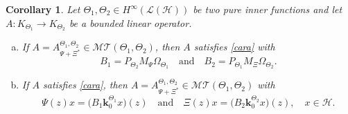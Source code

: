 \documentclass[11pt]{amsart}
\numberwithin{equation}{section}
\newcommand{\hsp}{\mathcal{H}}
\newcommand{\oL }{\mathcal{L}(\hsp) }
\newcommand{\dfc}[1]{D_{\Theta_#1}}
\newcommand{\ke}{{\mathbf{k}}}
\newtheorem{corollary}[theorem]{Corollary}
\theoremstyle{definition}
\numberwithin{equation}{section}
\begin{document}
%	


\begin{corollary}\label{cep}
	Let $ {\Theta_1},{\Theta_2} \in H^{\infty}(\oL)$ be two pure inner functions and let $A:K_{\Theta_{1}}\rightarrow  K_{\Theta_{2}}$ be a bounded linear operator.
	\begin{enumerate}[(a)]
\item If $A=A_{\Psi+\Xi^*}^{{\Theta_1},{\Theta_2}}\in \mathcal{MT}(\Theta_{1}, \Theta_{2})$, then $A$ satisfies \eqref{cara} with
\begin{equation}\label{symmm} B_1=P_{\Theta_2}M_{\Psi}\Omega_{\Theta_1}\quad\text{and}\quad B_2=P_{\Theta_1}M_{\Xi}\Omega_{\Theta_2}.
\end{equation}
		\item If $A$ satisfies \eqref{cara}, then $A=A_{\Psi+\Xi^*}^{{\Theta_1},{\Theta_2}}\in \mathcal{MT}(\Theta_{1}, \Theta_{2})$ with
			\begin{equation}\label{symm} \Psi(z)x=\big(B_1\ke_{0}^{\Theta_{1}}x\big)(z)\quad\text{and}\quad\Xi(z)x=\big(B_2\ke_{0}^{\Theta_{2}}x\big)(z),\quad x\in \hsp.
			\end{equation}
\end{enumerate}
\end{corollary}
\end{document}
